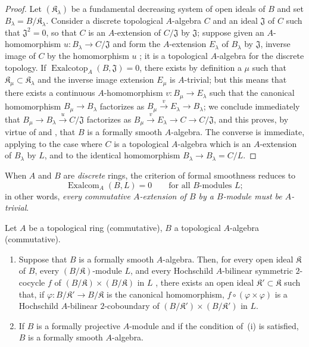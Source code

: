 \begin{proof}
Let $(\mathfrak K_\lambda)$ be a fundamental decreasing system of open ideals of $B$ and set $B_\lambda=B/\mathfrak K_\lambda$.
Consider a discrete topological $A$-algebra $C$ and an ideal $\mathfrak{J}$ of $C$ such that $\mathfrak{J}^2=0$, so that $C$ is an $A$-extension of $C/\mathfrak{J}$ by $\mathfrak{J}$;
suppose given an $A$-homomorphism $u:B_\lambda\to C/\mathfrak{J}$ and form the $A$-extension $E_\lambda$ of $B_\lambda$ by $\mathfrak{J}$, inverse image of $C$ by the homomorphism $u$ ;
it is a topological $A$-algebra for the discrete topology.
If $\operatorname{Exalcotop}_A(B,\mathfrak{J})=0$, there exists by definition  a $\mu$ such that $\mathfrak K_\mu\subset\mathfrak K_\lambda$ and the inverse image extension $E_\mu$ is $A$-trivial;
but this means  that there exists a continuous $A$-homomorphism $v:B_\mu\to E_\lambda$ such that the canonical homomorphism $B_\mu\to B_\lambda$ factorizes as $B_\mu\xrightarrow{v}E_\lambda\to B_\lambda$;
we conclude immediately that $B_\mu\to B_\lambda\xrightarrow{u}C/\mathfrak{J}$ factorizes as $B_\mu\xrightarrow{v}E_\lambda\to C\to C/\mathfrak{J}$,
and this proves, by virtue of  and , that $B$ is a formally smooth $A$-algebra.
The converse is immediate, applying  to the case where $C$ is a topological $A$-algebra which is an $A$-extension of $B_\lambda$ by $L$, and to the identical homomorphism $B_\lambda\to B_\lambda=C/L$.
\end{proof}

When $A$ and $B$ are \emph{discrete} rings, the criterion of formal smoothness  reduces to
\begin{equation}
\tag{19.4.4.1}
\label{0.19.4.4.1}
\operatorname{Exalcom}_A(B,L)=0 \qquad\text{for all $B$-modules $L$};
\end{equation}
in other words, \emph{every commutative $A$-extension of $B$ by a $B$-module must be $A$-trivial}.

\begin{corollary}[19.4.5]
\label{0.19.4.5}
Let $A$ be a topological ring (commutative), $B$ a topological $A$-algebra (commutative).
\begin{enumerate}
  \item[\rm(i)] Suppose that $B$ is a formally smooth $A$-algebra. Then, for every open ideal $\mathfrak K$ of $B$, every $(B/\mathfrak K)$-module $L$, and every Hochschild $A$-bilinear symmetric $2$-cocycle $f$ of $(B/\mathfrak K)\times(B/\mathfrak K)$ in $L$ , there exists an open ideal $\mathfrak K'\subset\mathfrak K$ such that, if $\varphi:B/\mathfrak K'\to B/\mathfrak K$ is the canonical homomorphism, $f\circ(\varphi\times\varphi)$ is a Hochschild $A$-bilinear $2$-coboundary of $(B/\mathfrak K')\times(B/\mathfrak K')$ in $L$.
  \item[\rm(ii)] If $B$ is a formally projective $A$-module  and if the condition of~{\rm(i)} is satisfied, $B$ is a formally smooth $A$-algebra.
\end{enumerate}
\end{corollary}

